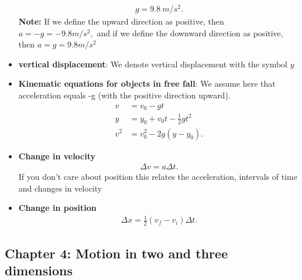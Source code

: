 \documentclass{report}
\begin{document}
\begin{itemize}
            \begin{align*}
                g = 9.8\ m/s^{2}
            .\end{align*}
            \textbf{Note:} If we define the upward direction as positive, then   $a=−g=-9.8m/s^{2},$ and if we define the downward direction as positive, then  $a=g=9.8m/s^{2}$
        \item \textbf{vertical displacement}: We denote vertical displacement with the symbol $y$
        \item \textbf{Kinematic equations for objects in free fall}: We assume here that acceleration equals -g (with the positive direction upward).
            \begin{align*}
                v &= v_{0} - gt \\
                y &= y_{0} + v_{0}t-\frac{1}{2}gt^{2} \\
                v^{2} &= v_{0}^{2} -2g(y-y_{0})
            .\end{align*}
        \item \textbf{Change in velocity}
            \begin{align*}
                \Delta v = a\Delta t
            .\end{align*}
            If you don't care about position this relates the acceleration,  intervals of time and changes in velocity
        \item \textbf{Change in position}
            \begin{align*}
                \Delta x = \frac{1}{2}(v_{f} - v_{i})\Delta t
            .\end{align*}
    \end{itemize}

    \pagebreak 
    \subsection{Chapter 4: Motion in two and three dimensions}
    \smallbreak \noindent
\end{document}
